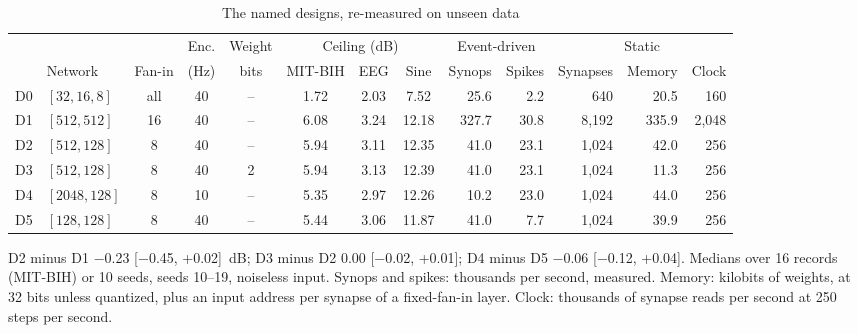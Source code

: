 \begin{table}[t]
\centering
\caption{The named designs, re-measured on unseen data}
\label{tab:designs}
\footnotesize
\setlength{\tabcolsep}{4.5pt}
\begin{tabular}{@{}llcccccc rrrrr@{}}
\toprule
 & & & Enc. & Weight & \multicolumn{3}{c}{Ceiling (dB)} & \multicolumn{2}{c}{Event-driven} & \multicolumn{3}{c}{Static} \\
\cmidrule(lr){6-8}\cmidrule(lr){9-10}\cmidrule(l){11-13}
 & Network & Fan-in & (Hz) & bits & MIT-BIH & EEG & Sine & Synops & Spikes & Synapses & Memory & Clock \\
\midrule
D0 & $[32,16,8]$ & all & 40 & -- & 1.72 & 2.03 & 7.52 & 25.6 & 2.2 & 640 & 20.5 & 160 \\
D1 & $[512,512]$ & 16 & 40 & -- & 6.08 & 3.24 & 12.18 & 327.7 & 30.8 & 8,192 & 335.9 & 2,048 \\
D2 & $[512,128]$ & 8 & 40 & -- & 5.94 & 3.11 & 12.35 & 41.0 & 23.1 & 1,024 & 42.0 & 256 \\
D3 & $[512,128]$ & 8 & 40 & 2 & 5.94 & 3.13 & 12.39 & 41.0 & 23.1 & 1,024 & 11.3 & 256 \\
D4 & $[2048,128]$ & 8 & 10 & -- & 5.35 & 2.97 & 12.26 & 10.2 & 23.0 & 1,024 & 44.0 & 256 \\
D5 & $[128,128]$ & 8 & 40 & -- & 5.44 & 3.06 & 11.87 & 41.0 & 7.7 & 1,024 & 39.9 & 256 \\
\bottomrule
\end{tabular}

\vspace{2pt}
{\scriptsize D2 minus D1 $-$0.23 [$-$0.45, +0.02]~dB; D3 minus D2 0.00 [$-$0.02, +0.01]; D4 minus D5 $-$0.06 [$-$0.12, +0.04]. Medians over 16 records (MIT-BIH) or 10 seeds, seeds 10--19, noiseless input. Synops and spikes: thousands per second, measured. Memory: kilobits of weights, at 32 bits unless quantized, plus an input address per synapse of a fixed-fan-in layer. Clock: thousands of synapse reads per second at 250 steps per second.}
\end{table}
